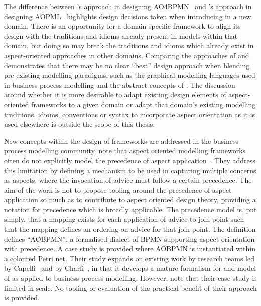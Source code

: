 The difference between \citeauthor{charfi2010AO4BPMN}'s approach in designing
AO4BPMN~\cite{charfi2010AO4BPMN} and \citeauthor{Cappelli_AOBPM}'s approach in
designing AOPML~\cite{Cappelli_AOBPM} highlights design decisions taken when
introducing \aspectorientation{} in a new domain. There is an opportunity for a
domain-specific \aspectorientation{} framework to align its design with the
traditions and idioms already present in models within that domain, but doing so
may break the traditions and idioms which already exist in aspect-oriented
approaches in other domains.  Comparing the approaches of
\citeauthor{charfi2010AO4BPMN} and \citeauthor{Cappelli_AOBPM} demonstrates that
there may be no clear ``best'' design approach when blending pre-existing
modelling paradigms, such as the graphical modelling languages used in
business-process modelling and the abstract concepts of \aspectorientation{}.
The discussion around whether it is more desirable to adapt existing design
elements of aspect-oriented frameworks to a given domain or adapt that domain's
existing modelling traditions, idioms, conventions or syntax to incorporate
aspect orientation as it is used elsewhere is outside the scope of this thesis.

New concepts within the design of \aspectorientation{} frameworks are addressed in
the business process modelling community.  note
that aspect oriented modelling frameworks often do not explicitly model the
precedence of aspect application~\cite{jalali2012aspect}. They address this
limitation by defining a mechanism to be used in capturing multiple concerns as
aspects, where the invocation of advice must follow a certain precedence. The
aim of the work is not to propose tooling around the precedence of aspect
application so much as to contribute to aspect oriented design theory, providing
a notation for precedence which is broadly applicable. The precedence model is,
put simply, that a mapping exists for each application of advice to join point
such that the mapping defines an ordering on advice for that join point. The
definition defines ``AOBPMN'', a formalised dialect of BPMN supporting aspect
orientation with precedence. A case study is provided where AOBPMN is
instantiated within a coloured Petri net. Their study expands on existing work
by research teams led by Capelli~\cite{Cappelli_AOBPM,da2020implementation} and
by Charfi~\cite{charfi2007ao4bpel}, in that it develops a mature formalism for
and model of \aspectorientation{} as applied to business process modelling.
However, \citeauthor{jalali2012aspect} note that their case study is limited in
scale. No tooling or evaluation of the practical benefit of their approach is
provided.


